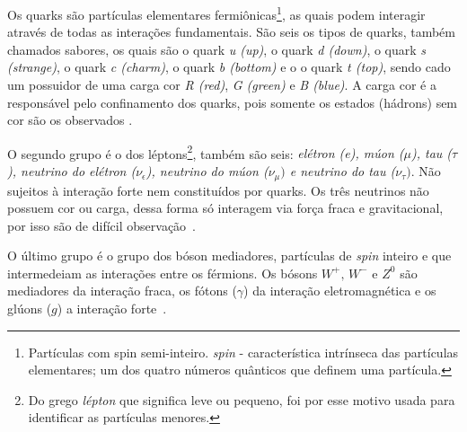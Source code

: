 Os quarks são partículas elementares fermiônicas\footnote{Partículas com spin semi-inteiro. \textit{spin} - característica intrínseca das partículas elementares; um dos quatro números quânticos que definem uma partícula.}, as quais podem interagir através de todas as interações fundamentais. São seis os tipos de quarks, também chamados sabores, os quais são o quark \textit{u (up)}, o quark \textit{d (down)}, o quark \textit{s (strange)}, o quark \textit{c (charm)}, o quark \textit{b (bottom)} e o o quark \textit{t (top)}, sendo cado um possuidor de uma carga cor \textit{R (red)}, \textit{G (green)} e \textit{B (blue)}. A carga cor é a responsável pelo confinamento dos quarks, pois somente os estados (hádrons) sem cor são os observados \cite{pimenta2013}.


O segundo grupo é o dos léptons\footnote{Do grego \textit{lépton} que significa leve ou pequeno, foi por esse motivo usada para identificar as partículas menores.}, também são seis: \textit{elétron (e), múon ($\mu$), tau ($\tau$), neutrino do elétron ($\nu_\epsilon$), neutrino do múon ($\nu_\mu)$ e neutrino do tau ($\nu_\tau)$}. Não sujeitos à interação forte nem constituídos por quarks. Os três neutrinos não possuem cor ou carga, dessa forma só interagem via força fraca e gravitacional, por isso são de difícil observação~\cite[Cap. 6, 7]{book:Ellwanger2012}.

O último grupo é o grupo dos bóson mediadores, partículas de \textit{spin} inteiro e que intermedeiam as interações entre os férmions. Os bósons $W^+, \, W^-$ e $Z^0$ são mediadores da interação fraca, os fótons ($\gamma$) da interação eletromagnética e os glúons ($g$) a interação forte~\cite[Cap. 8]{book:Braibant2012}.

